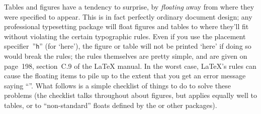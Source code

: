 Tables and figures have a tendency to surprise, by \emph{floating}
away from where they were specified to appear.  This is in fact
perfectly ordinary document design; any professional typesetting
package will float figures and tables to where they'll fit without
violating the certain typographic rules.  Even if you use the
placement specifier~''\texttt{h}'' (for `here'), the figure or table
will not be 
printed `here' if doing so would break the rules; the rules themselves
are pretty simple, and are given on page~198, section~C.9 of the
\LaTeX{} manual.  In the worst case, \LaTeX{}'s rules can cause the
floating items to pile up to the extent that you get an error message
saying ``''.
What follows is a simple checklist of things to do to solve these
problems (the checklist talks throughout about figures, but applies
equally well to tables, or to ``non-standard'' floats defined by the
 or other packages).
